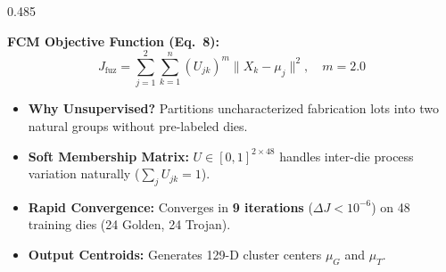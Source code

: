 \documentclass[aspectratio=169,11pt]{beamer}
\begin{document}
\begin{frame}[t]
  \vspace*{-0.15cm}

  \begin{columns}[T, onlytextwidth]
    \begin{column}{0.485\textwidth}
      \begin{glassbox}[top=2pt, bottom=2pt, left=6pt, right=6pt, title={Fuzzy C-Means Clustering ($c=2$)}]{}
        \textbf{FCM Objective Function (Eq.\ 8):}
        {\setlength{\abovedisplayskip}{1.0pt}\setlength{\belowdisplayskip}{1.0pt}
        \begin{equation*}
          J_{\text{fuz}} = \sum_{j=1}^2 \sum_{k=1}^n (U_{jk})^m \|X_k - \mu_j\|^2, \quad m=2.0
        \end{equation*}}
        \begin{itemize}\setlength{\itemsep}{1.2pt}
          \item \textbf{Why Unsupervised?} Partitions uncharacterized fabrication lots into two natural groups without pre-labeled dies.
          \item \textbf{Soft Membership Matrix:} $U \in [0, 1]^{2 \times 48}$ handles inter-die process variation naturally ($\sum_j U_{jk} = 1$).
          \item \textbf{Rapid Convergence:} Converges in \textbf{9 iterations} ($\Delta J < 10^{-6}$) on 48 training dies (24 Golden, 24 Trojan).
          \item \textbf{Output Centroids:} Generates 129-D cluster centers $\mu_G$ and $\mu_T$.
        \end{itemize}
      \end{glassbox}
    \end{column}


\end{columns}
\end{frame}
\end{document}
